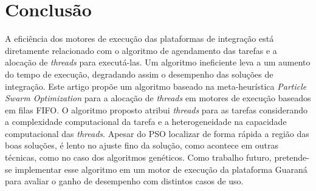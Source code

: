 \section{Conclus\~{a}o}
\label{sec:conclusao}
A eficiência dos motores de execução das plataformas de integração está diretamente relacionado com o algoritmo de agendamento das tarefas e a alocação de \emph{threads} para executá-las. Um algoritmo ineficiente leva a um aumento do tempo de execução, degradando assim o desempenho das soluções de integração. Este artigo propõe um algoritmo baseado na meta-heurística \textit{Particle Swarm Optimization} para a alocação de \emph{threads} em motores de execução baseados em filas FIFO. O algoritmo proposto atribui \emph{threads} para as tarefas considerando a complexidade computacional da tarefa e a heterogeneidade na capacidade computacional das \emph{threads}. 
Apesar do PSO localizar de forma rápida a região das boas soluções, é lento no ajuste fino da solução, como acontece em outras técnicas, como no caso dos algoritmos genéticos. Como trabalho futuro, pretende-se implementar esse algoritmo em um motor de execução da plataforma Guaraná para avaliar o ganho de desempenho com distintos casos de uso.